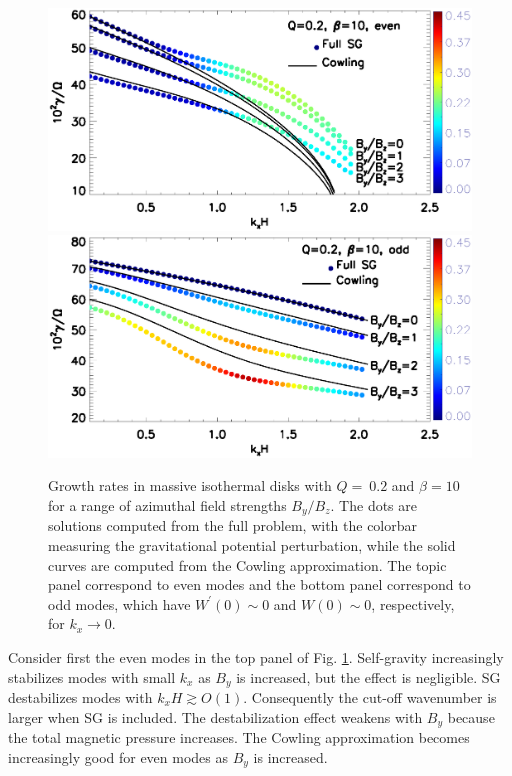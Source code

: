 \begin{figure}
  \includegraphics[width=\linewidth,clip=true,trim=0cm 2cm 0cm 0cm]{figures/compare_growth3_tilted_even.ps} 
  \includegraphics[width=\linewidth,clip=true,trim=0cm 0cm 0cm 0.52cm]{figures/compare_growth3_tilted_odd.ps}
  \caption{Growth rates in massive isothermal disks with $Q=~0.2$ and
    $\beta=10$ for a range of azimuthal field strengths $B_y/B_z$. The
    dots are solutions computed from the full problem, with the
    colorbar measuring the gravitational potential perturbation, while
    the solid curves are computed from the Cowling approximation. The
    topic panel correspond to even modes and the
    bottom panel correspond to odd modes, which have
    $W^\prime(0)\sim0$ and $W(0)\sim0$, respectively, for $k_x\to0$.
    \label{compare_growth3_tilted}}
\end{figure}


Consider first the even modes in the top panel of
Fig. \ref{compare_growth3_tilted}. Self-gravity increasingly stabilizes
modes with small $k_x$ as $B_y$ is increased, but the effect is
negligible. SG destabilizes modes with  $k_xH\gtrsim
O(1)$. Consequently the cut-off wavenumber is larger when SG is
included. The destabilization effect weakens with $B_y$ because the
total magnetic pressure increases. %
The Cowling approximation becomes 
increasingly good for even modes as $B_y$ is increased. 


